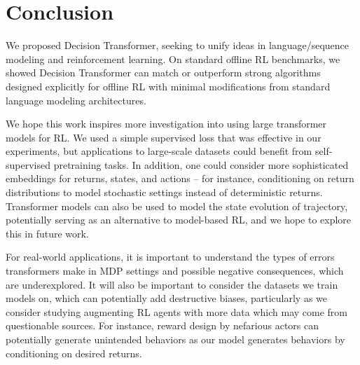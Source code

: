 
\section{Conclusion}

We proposed Decision Transformer, seeking to unify ideas in language/sequence modeling and reinforcement learning.
On standard offline RL benchmarks, we showed Decision Transformer can match or outperform strong algorithms designed explicitly for offline RL with minimal modifications from standard language modeling architectures.

We hope this work inspires more investigation into using large transformer models for RL. 
We used a simple supervised loss that was effective in our experiments, but applications to large-scale datasets could benefit from self-supervised pretraining tasks.
In addition, one could consider more sophisticated embeddings for returns, states, and actions -- for instance, conditioning on return distributions to model stochastic settings instead of deterministic returns.
Transformer models can also be used to model the state evolution of trajectory, potentially serving as an alternative to model-based RL, and we hope to explore this in future work.

For real-world applications, it is important to understand the types of errors transformers make in MDP settings and possible negative consequences, which are underexplored.
It will also be important to consider the datasets we train models on, which can potentially add destructive biases, particularly as we consider studying augmenting RL agents with more data which may come from questionable sources.
For instance, reward design by nefarious actors can potentially generate unintended behaviors as our model generates behaviors by conditioning on desired returns.
